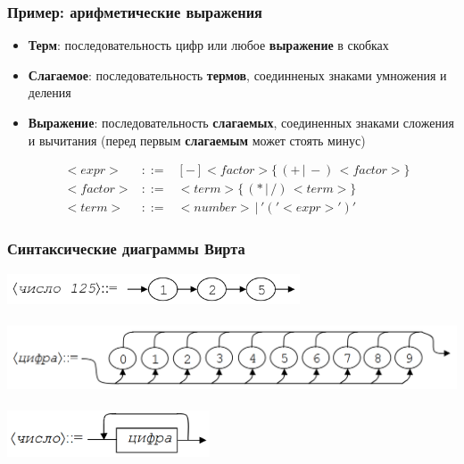 \documentclass{beamer}
\begin{document}
\begin{frame}[fragile]
  \transwipe[direction=90]
  \frametitle{Пример: арифметические выражения}

  \begin{itemize}
    \item \textbf{Терм}: последовательность цифр или любое \textbf{выражение} в скобках
    \item \textbf{Слагаемое}: последовательность \textbf{термов}, соединненых знаками умножения и деления
    \item \textbf{Выражение}: последовательность \textbf{слагаемых}, соединенных знаками сложения и вычитания (перед первым \textbf{слагаемым} может стоять минус)
  \end{itemize}  
  

$$
\begin{array}{crcl}
&<expr>& ::= & [-] <factor> \{ \, ( + \, | \, - ) \, <factor> \} \\
&<factor>& ::= & <term> \{ \, (* \, | \, /) \, <term> \} \\
&<term>& ::= & <number> \, | \, '(' <expr> ')'
\end{array}
$$

\end{frame}

\begin{frame}[fragile]
  \transwipe[direction=90]
  \frametitle{Синтаксические диаграммы Вирта}
\begin{center}
  \includegraphics[width=0.65\textwidth]{pics/sdseq.png}  \\~\\     \pause
  \includegraphics[width=1.0\textwidth]{pics/sddig.png}  \\~\\  \pause   
  \includegraphics[width=0.45\textwidth]{pics/sdnum.png}  
\end{center}
\end{frame}
\end{document}
